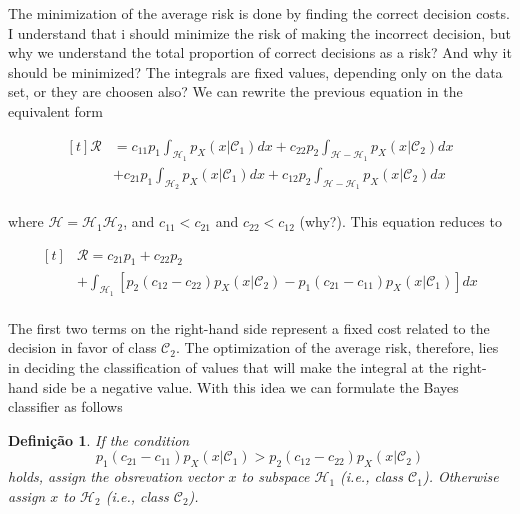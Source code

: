 \documentclass[twocolumn]{article}
\newcommand{\integral}{\displaystyle\int}
\newtheorem{definicao}{Definição}[section]
\begin{document}
		 The minimization of the average risk is done by finding the correct decision costs. I understand that i should minimize the risk of making the incorrect decision, but why we understand the total proportion of correct decisions as a risk? And why it should be minimized? The integrals are fixed values, depending only on the data set, or they are choosen also?
		 We can rewrite the previous equation in the equivalent form

		 $$ \begin{aligned}[t]
				 \mathcal{R} & = c_{11}p_{1}\integral_{ \mathcal{H}_{1}}p_{X} (x | \mathcal{C}_{1})dx + c_{22}p_{2}\integral_{ \mathcal{H} - \mathcal{H}_{1}}p_{X} (x | \mathcal{C}_{2})dx  \\
				             & + c_{21}p_{1}\integral_{ \mathcal{H}_{2}}p_{X} (x | \mathcal{C}_{1})dx + c_{12}p_{2}\integral_{ \mathcal{H} - \mathcal{H}_{1}} p_{X} (x | \mathcal{C}_{2})dx \\
			 \end{aligned} $$

		 \noindent where $ \mathcal{H} = \mathcal{H}_{1} \mathcal{H}_{2} $, and $ c_{11} < c_{21} $ and $ c_{22} < c_{12} $ (why?). This equation reduces to

		 $$ \begin{aligned}[t]
				  & \mathcal{R} = c_{21}p_{1} + c_{22}p_{2}                                                                                                      \\
				  & + \integral_{ \mathcal{H}_{1} }[ p_{2} (c_{12} - c_{22})p_{X} (x | \mathcal{C}_{2}) - p_{1} (c_{21} - c_{11})p_{X} (x | \mathcal{C}_{1}) ]dx \\
			 \end{aligned}$$



		 The first two terms on the right-hand side represent a fixed cost related to the decision in favor of class $ \mathcal{C}_{2} $. The optimization of the average risk, therefore, lies in deciding the classification of values that will make the integral at the right-hand side be a negative value. With this idea we can formulate the Bayes classifier as follows

		 \begin{definicao}
			 If the condition
			 $$ p_{1} (c_{21} - c_{11}) p_{X} (x | \mathcal{C}_{1}) > p_{2} (c_{12} - c_{22}) p_{X} (x | \mathcal{C}_{2}) $$
			 \noindent holds, assign the obsrevation vector $ x $ to subspace $ \mathcal{H}_{1} $ (i.e., class $ \mathcal{C}_{1} $). Otherwise assign $ x $ to $ \mathcal{H}_{2} $ (i.e., class $ \mathcal{C}_{2} $).
		 \end{definicao}
\end{document}
